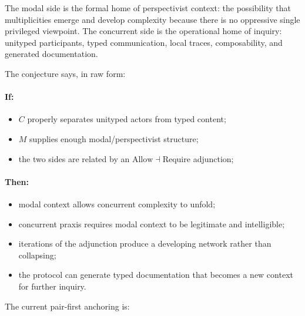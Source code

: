 \documentclass[11pt]{article}
\newcommand{\Allow}{\mathrm{Allow}}
\newcommand{\Require}{\mathrm{Require}}
\begin{document}
The modal side is the formal home of perspectivist context: the possibility
that multiplicities emerge and develop complexity because there is no
oppressive single privileged viewpoint. The concurrent side is the operational
home of inquiry: unityped participants, typed communication, local traces,
composability, and generated documentation.

The conjecture says, in raw form:

\paragraph{If:}
\begin{itemize}
\item \(C\) properly separates unityped actors from typed content;
\item \(M\) supplies enough modal/perspectivist structure;
\item the two sides are related by an \(\Allow \dashv \Require\) adjunction;
\end{itemize}

\paragraph{Then:}
\begin{itemize}
\item modal context allows concurrent complexity to unfold;
\item concurrent praxis requires modal context to be legitimate and
intelligible;
\item iterations of the adjunction produce a developing network rather than
collapsing;
\item the protocol can generate typed documentation that becomes a new context
for further inquiry.
\end{itemize}

The current pair-first anchoring is:
\end{document}
